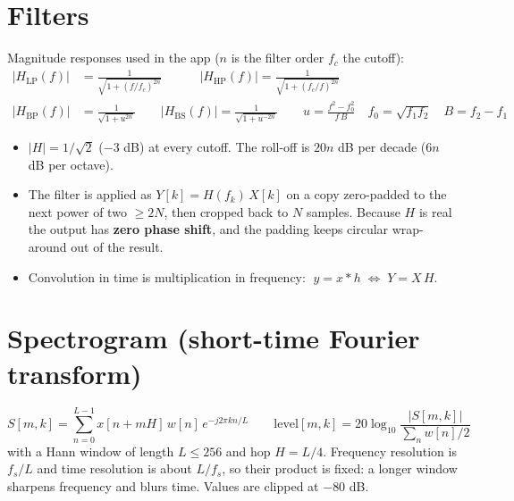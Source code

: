 \documentclass[10pt,a4paper]{article}
\begin{document}
\section{Filters}
Magnitude responses used in the app ($n$ is the filter order $f_c$ the cutoff):
\begin{align*}
|H_{\mathrm{LP}}(f)| &= \frac{1}{\sqrt{1 + (f/f_c)^{2n}}}
\qquad\quad
|H_{\mathrm{HP}}(f)| = \frac{1}{\sqrt{1 + (f_c/f)^{2n}}}\\[2pt]
|H_{\mathrm{BP}}(f)| &= \frac{1}{\sqrt{1 + u^{2n}}}
\qquad
|H_{\mathrm{BS}}(f)| = \frac{1}{\sqrt{1 + u^{-2n}}}
\qquad
u = \frac{f^2 - f_0^2}{f\,B}
\quad f_0 = \sqrt{f_1 f_2}\quad B = f_2 - f_1
\end{align*}
\begin{itemize}
\item $|H| = 1/\sqrt{2}$ ($-3$ dB) at every cutoff. The roll-off is $20n$ dB per decade ($6n$ dB per octave).
\item The filter is applied as $Y[k] = H(f_k)\,X[k]$ on a copy zero-padded to the next power of two $\ge 2N$, then cropped back to $N$ samples. Because $H$ is real the output has \textbf{zero phase shift}, and the padding keeps circular wrap-around out of the result.
\item Convolution in time is multiplication in frequency: $\;y = x * h \;\Longleftrightarrow\; Y = X\,H$.
\end{itemize}

\section{Spectrogram (short-time Fourier transform)}
\[
S[m,k] = \sum_{n=0}^{L-1} x[n + mH]\,w[n]\,e^{-j2\pi kn/L}
\qquad
\mathrm{level}[m,k] = 20\log_{10}\frac{|S[m,k]|}{\sum_n w[n]/2}
\]
with a Hann window of length $L \le 256$ and hop $H = L/4$. Frequency resolution is $f_s/L$ and time resolution is about $L/f_s$, so their product is fixed: a longer window sharpens frequency and blurs time. Values are clipped at $-80$ dB.
\end{document}
